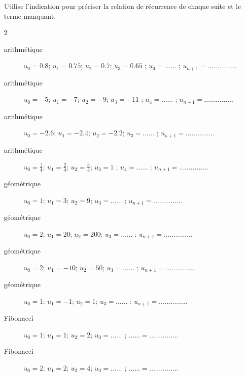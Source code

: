 \documentclass[main.tex]{subfiles}
\begin{document}
\begin{exercise} \label{chapter05:exercise:suites02}
 Utilise l'indication pour préciser la relation de récurrence de chaque suite et le terme manquant.
	\begin{spacing}{2}
		\vspace{-1.0em}
		\begin{description} 
			\item[arithmétique] $u_0=0.8$; $u_1=0.75$; $u_2=0.7$; $u_3=0.65$ ; $u_4=\ldots\ldots$  ;  \hfill  {$u_{n+1}=\ldots\ldots\ldots\ldots\ldots $} 
			\item[arithmétique] $u_0=-5$; $u_1=-7$; $u_2=-9$; $u_3=-11$ ; $u_4=\ldots\ldots$  ;  \hfill  {$u_{n+1}=\ldots\ldots\ldots\ldots\ldots $} 
			\item[arithmétique] $u_0=-2.6$; $u_1=-2.4$; $u_2=-2.2$; $u_3=\ldots\ldots$ ;    \hfill  {$u_{n+1}=\ldots\ldots\ldots\ldots\ldots $} 
			\item[arithmétique] $u_0=\tfrac{1}{4}$; $u_1=\tfrac{2}{4}$; $u_2=\tfrac{3}{4}$; $u_3=1$ ; $u_4=\ldots\ldots$  ;  \hfill  {$u_{n+1}=\ldots\ldots\ldots\ldots\ldots $} 
			\item[géométrique] $u_0=1$; $u_1=3$; $u_2=9$; $u_3= \ldots\ldots$  ;  \hfill  {$u_{n+1}=\ldots\ldots\ldots\ldots\ldots $}
			\item[géométrique] $u_0=2$; $u_1=20$; $u_2=200$; $u_3= \ldots\ldots$  ;  \hfill  {$u_{n+1}=\ldots\ldots\ldots\ldots\ldots $}
			\item[géométrique] $u_0=2$; $u_1=-10$; $u_2=50$; $u_3= \ldots\ldots$  ;  \hfill  {$u_{n+1}=\ldots\ldots\ldots\ldots\ldots $}
			\item[géométrique] $u_0=1$; $u_1=-1$; $u_2=1$; $u_3= \ldots\ldots$  ;  \hfill  {$u_{n+1}=\ldots\ldots\ldots\ldots\ldots $}
			\item[Fibonacci] $u_0=1$; $u_1=1$; $u_2=2$; $u_3= \ldots\ldots$  ;  \hfill  {$\ldots\ldots=\ldots\ldots\ldots\ldots\ldots $}
			\item[Fibonacci] $u_0=2$; $u_1=2$; $u_2=4$; $u_3= \ldots\ldots$  ;  \hfill  {$\ldots\ldots=\ldots\ldots\ldots\ldots\ldots $}
		\end{description} 
	\end{spacing}\vspace{-0.5em}
\end{exercise}
\end{document}

